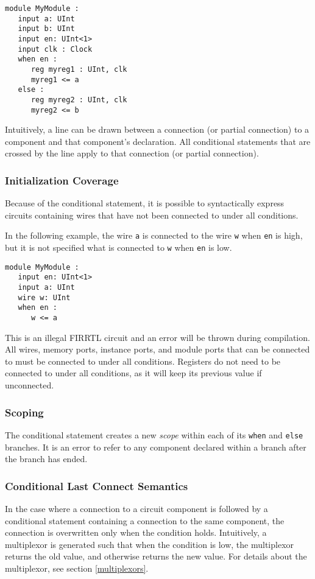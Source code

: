 \documentclass[12pt]{article}
\begin{document}
\begin{verbatim}
module MyModule :
   input a: UInt
   input b: UInt
   input en: UInt<1>
   input clk : Clock
   when en :
      reg myreg1 : UInt, clk
      myreg1 <= a
   else :
      reg myreg2 : UInt, clk
      myreg2 <= b
\end{verbatim}

Intuitively, a line can be drawn between a connection (or partial connection) to a component and that component's declaration. All conditional statements that are crossed by the line apply to that connection (or partial connection).

\subsubsection{Initialization Coverage}
Because of the conditional statement, it is possible to syntactically express circuits containing wires that have not been connected to under all conditions.

In the following example, the wire \verb|a| is connected to the wire \verb|w| when \verb|en| is high, but it is not specified what is connected to \verb|w| when \verb|en| is low.

\begin{verbatim}
module MyModule :
   input en: UInt<1>   
   input a: UInt
   wire w: UInt
   when en :
      w <= a
\end{verbatim}

This is an illegal FIRRTL circuit and an error will be thrown during compilation. All wires, memory ports, instance ports, and module ports that can be connected to must be connected to under all conditions. Registers do not need to be connected to under all conditions, as it will keep its previous value if unconnected.

\subsubsection{Scoping}
The conditional statement creates a new {\em scope} within each of its \verb|when| and \verb|else| branches. It is an error to refer to any component declared within a branch after the branch has ended.

\subsubsection{Conditional Last Connect Semantics}\label{conditional_last_connect}
In the case where a connection to a circuit component is followed by a conditional statement containing a connection to the same component, the connection is overwritten only when the condition holds. Intuitively, a multiplexor is generated such that when the condition is low, the multiplexor returns the old value, and otherwise returns the new value. For details about the multiplexor, see section \ref{multiplexors}.
\end{document}
